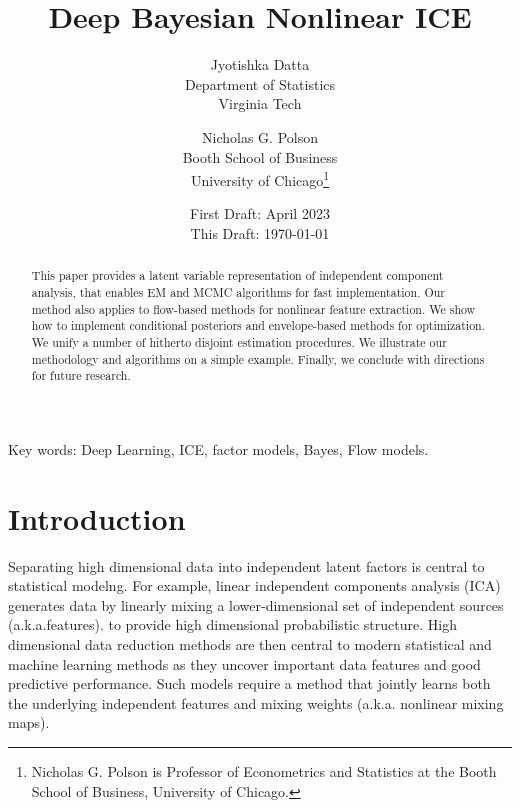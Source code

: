\documentclass[11pt]{article}%
\begin{document}
\title{Deep Bayesian Nonlinear ICE}

\author{Jyotishka Datta \\ Department of Statistics \\ Virginia Tech \and Nicholas G. Polson\\
Booth School of Business\\University of Chicago\thanks{Nicholas G. Polson is Professor of Econometrics and Statistics at the Booth School of Business,
University of Chicago.  }}

\date{First Draft: April 2023\\
This Draft: \today{}}

\maketitle


\begin{abstract}
\noindent This paper provides a latent variable representation of independent component analysis, that enables EM and MCMC algorithms for fast implementation. Our method also applies to flow-based methods for nonlinear feature extraction. We show how to implement conditional posteriors and envelope-based methods for optimization. We unify a number of hitherto disjoint estimation procedures. We illustrate our methodology and algorithms on a simple example. Finally, we conclude with directions for future research. 
\end{abstract}

\begin{flushleft}
Key words:  Deep Learning, ICE, factor models, Bayes, Flow models.
\end{flushleft}

\newpage
\section{Introduction}
Separating high dimensional data into independent latent factors is central to statistical modelng. 
For example, linear independent components analysis (ICA) generates data by linearly mixing a lower-dimensional set of independent sources (a.k.a.features). to provide high dimensional probabilistic structure. 
High dimensional data reduction  methods are then central to modern statistical and machine learning methods as they uncover important data features and good predictive performance.  Such models  require a method that jointly learns both the underlying independent features and mixing weights (a.k.a. nonlinear mixing maps).
\end{document}
